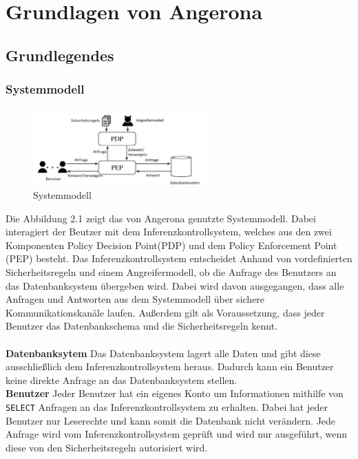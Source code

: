 \documentclass[german,version-2020-11]{uzl-thesis}
\begin{document}
\chapter{Grundlagen von Angerona}
\section{Grundlegendes}
\subsection{Systemmodell}
\begin{figure}[ht]
	\centering
	\includegraphics[width=0.6\textwidth]{System-model.PNG}
	\caption{Systemmodell}
	\label{fig1}
	\end{figure}
Die Abbildung 2.1 zeigt das von Angerona genutzte Systemmodell. Dabei interagiert der Beutzer mit dem Inferenzkontrollsystem, welches aus den zwei Komponenten Policy Decision Point(PDP) und dem Policy Enforcement Point (PEP) besteht. Das Inferenzkontrollsystem entscheidet Anhand von vordefinierten Sicherheitsregeln und einem Angreifermodell, ob die Anfrage des Benutzers an das Datenbanksystem übergeben wird. Dabei wird davon ausgegangen, dass alle Anfragen und Antworten aus dem Systemmodell über sichere Kommunikationskanäle laufen. Außerdem gilt als Voraussetzung, dass jeder Benutzer das Datenbankschema und die Sicherheitsregeln kennt. \\ \\ 
\textbf{Datenbanksytem} Das Datenbanksystem lagert alle Daten und gibt diese ausschließlich dem Inferenzkontrollsystem  heraus. Dadurch kann ein Benutzer keine direkte Anfrage an das Datenbanksystem stellen.   \\  
\textbf{Benutzer} Jeder Benutzer hat ein eigenes Konto um Informationen mithilfe von \texttt{SELECT} Anfragen an das Inferenzkontrollsystem zu erhalten. Dabei hat jeder Benutzer nur Leserechte und kann somit die Datenbank nicht verändern. Jede Anfrage wird vom Inferenzkontrollsystem geprüft und wird nur ausgeführt, wenn diese von den Sicherheitsregeln autorisiert wird. \\ 
\end{document}
